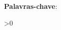 \documentclass[
    12pt,               %
    oneside,            %
    a4paper,            %
    chapter=TITLE,      %
    section=TITLE,      %
    english,            %
    brazil              %
]{abntex2}
\begin{document}

\frenchspacing


\pretextual

\imprimircapa

\imprimirfolhaderosto

%     

\imprimirfolhadabanca




\begin{resumo}
    \imprimirresumo
    \par
    \noindent \textbf{Palavras-chave}: \imprimirpalavraschave
\end{resumo}

\ifnum{}>0
    \listoffigures*
    \cleardoublepage
\fi
\end{document}
